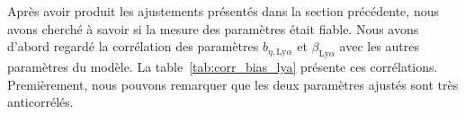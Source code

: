 Après avoir produit les ajustements présentés dans la section précédente, nous avons cherché à savoir si la mesure des paramètres \lya{} était fiable. Nous avons d'abord regardé la corrélation des paramètres $b_{\eta,\mathrm{Ly}\alpha}$ et $\beta_{\mathrm{Ly}\alpha}$ avec les autres paramètres du modèle. La table~\ref{tab:corr_bias_lya} présente ces corrélations.
Premièrement, nous pouvons remarquer que les deux paramètres \lya{} ajustés sont très anticorrélés.
